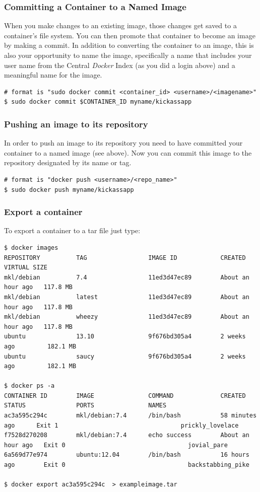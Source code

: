 \documentclass[11pt]{article}
\begin{document}
\subsubsection{Committing a Container to a Named Image}
\label{sec-2-2-8}

When you make changes to an existing image, those changes get saved to a container’s file system. You can then promote that container to become an image by making a commit. In addition to converting the container to an image, this is also your opportunity to name the image, specifically a name that includes your user name from the Central \emph{Docker} Index (as you did a login above) and a meaningful name for the image.

\begin{verbatim}
# format is "sudo docker commit <container_id> <username>/<imagename>"
$ sudo docker commit $CONTAINER_ID myname/kickassapp
\end{verbatim}
\subsubsection{Pushing an image to its repository}
\label{sec-2-2-9}

In order to push an image to its repository you need to have committed your container to a named image (see above).
Now you can commit this image to the repository designated by its name or tag.

\begin{verbatim}
# format is "docker push <username>/<repo_name>"
$ sudo docker push myname/kickassapp
\end{verbatim}
\subsubsection{Export a container}
\label{sec-2-2-10}

To export a container to a tar file just type:

\begin{verbatim}
$ docker images
REPOSITORY          TAG                 IMAGE ID            CREATED             VIRTUAL SIZE
mkl/debian          7.4                 11ed3d47ec89        About an hour ago   117.8 MB
mkl/debian          latest              11ed3d47ec89        About an hour ago   117.8 MB
mkl/debian          wheezy              11ed3d47ec89        About an hour ago   117.8 MB
ubuntu              13.10               9f676bd305a4        2 weeks ago         182.1 MB
ubuntu              saucy               9f676bd305a4        2 weeks ago         182.1 MB

$ docker ps -a
CONTAINER ID        IMAGE               COMMAND             CREATED             STATUS              PORTS               NAMES
ac3a595c294c        mkl/debian:7.4      /bin/bash           58 minutes ago      Exit 1                                  prickly_lovelace    
f7528d270208        mkl/debian:7.4      echo success        About an hour ago   Exit 0                                  jovial_pare         
6a569d77e974        ubuntu:12.04        /bin/bash           16 hours ago        Exit 0                                  backstabbing_pike 

$ docker export ac3a595c294c  > exampleimage.tar
\end{verbatim}
\end{document}
